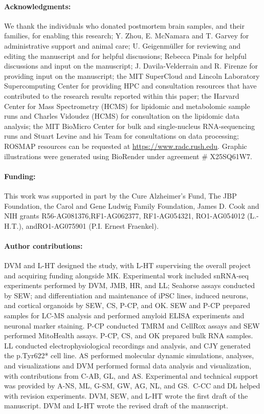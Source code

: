 \paragraph{Acknowledgments:} We thank the individuals who donated postmortem brain samples, and their families, for enabling this research; Y. Zhou, E. McNamara and T. Garvey for administrative support and animal care; U. Geigenmüller for reviewing and editing the manuscript and for helpful discussions; Rebecca Pinals for helpful discussions and input on the manuscript; J. Davila-Velderrain and R. Firenze for providing input on the manuscript; the MIT SuperCloud and Lincoln Laboratory Supercomputing Center for providing HPC and consultation resources that have contributed to the research results reported within this paper; the Harvard Center for Mass Spectrometry (HCMS) for lipidomic and metabolomic sample runs and Charles Vidoudez (HCMS) for consultation on the lipidomic data analysis; the MIT BioMicro Center for bulk and single-nucleus RNA-sequencing runs and Stuart Levine and his Team for consultations on data processing; ROSMAP resources can be requested at \url{https://www.radc.rush.edu}. Graphic illustrations were generated using BioRender under agreement \# X25SQ61W7.

\paragraph{Funding:} This work was supported in part by the Cure Alzheimer’s Fund, The JBP Foundation, the Carol and Gene Ludwig Family Foundation, James D. Cook and NIH grants R56-AG081376,RF1-AG062377, RF1-AG054321, RO1-AG054012 (L.-H.T.), andRO1-AG075901 (P.I. Ernest Fraenkel).

\paragraph{Author contributions:} DVM and L-HT designed the study, with L-HT supervising the overall project and acquiring funding alongside MK. Experimental work included snRNA-seq experiments performed by DVM, JMB, HR, and LL; Seahorse assays conducted by SEW; and differentiation and maintenance of iPSC lines, induced neurons, and cortical organoids by SEW, CS, P-CP, and OK. SEW and P-CP prepared samples for LC-MS analysis and performed amyloid ELISA experiments and neuronal marker staining. P-CP conducted TMRM and CellRox assays and SEW performed MitoHealth assays. P-CP, CS, and OK prepared bulk RNA samples. LL conducted electrophysiological recordings and analysis, and CJY generated the p.Tyr622* cell line. AS performed molecular dynamic simulations, analyses, and visualizations and DVM performed formal data analysis and visualization, with contributions from C-AB, GL, and AS. Experimental and technical support was provided by A-NS, ML, G-SM, GW, AG, NL, and GS. C-CC and DL helped with revision experiments. DVM, SEW, and L-HT wrote the first draft of the manuscript. DVM and L-HT wrote the revised draft of the manuscript.

